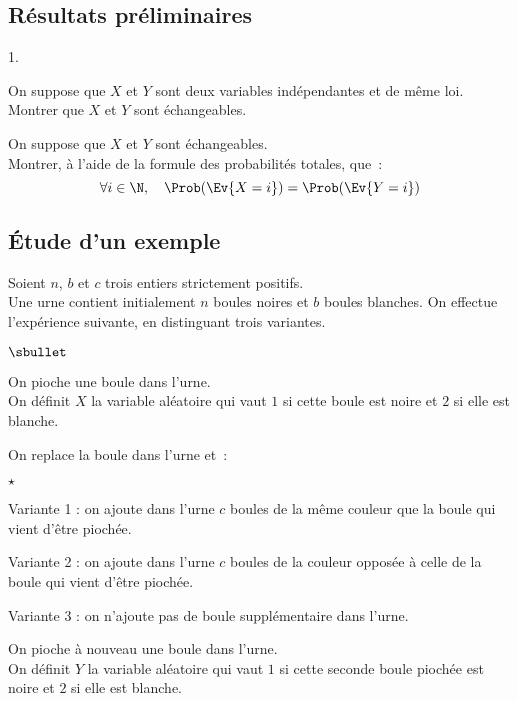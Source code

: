 \subsection*{Résultats préliminaires}

\begin{noliste}{1.}
\setlength{\itemsep}{2mm}
\item On suppose que $X$ et $Y$ sont deux variables indépendantes et de 
même loi.\\
Montrer que $X$ et $Y$ sont échangeables.




\item On suppose que $X$ et $Y$ sont échangeables.\\
  Montrer, à l'aide de la formule des probabilités totales, que~:
  \[ 
  \forall i \in \N, \quad \Prob(\Ev{X=i}) = \Prob(\Ev{Y=i}) 
  \]
  
  
  
\end{noliste}




\subsection*{\'Etude d'un exemple}

\noindent
Soient $n$, $b$ et $c$ trois entiers strictement positifs.\\
Une urne contient initialement $n$ boules noires et $b$ boules
blanches. On effectue l'expérience suivante, en distinguant trois
variantes.

\begin{noliste}{$\sbullet$}
\item On pioche une boule dans l'urne. \\
  On définit $X$ la variable aléatoire qui vaut $1$ si cette boule est
  noire et $2$ si elle est blanche.
  
\item On replace la boule dans l'urne et~:
  \begin{noliste}{$\star$}
  \item Variante 1 : on ajoute dans l'urne $c$ boules de la même 
    couleur que la boule qui vient d'être piochée.
    
  \item Variante 2 : on ajoute dans l'urne $c$ boules de la 
    couleur opposée à celle de la boule qui vient d'être piochée.
    
  \item Variante 3 : on n'ajoute pas de boule supplémentaire 
    dans l'urne.
  \end{noliste}
  
\item On pioche à nouveau une boule dans l'urne.\\
  On définit $Y$ la variable aléatoire qui vaut $1$ si cette seconde 
  boule piochée est noire et $2$ si elle est blanche.
\end{noliste}

